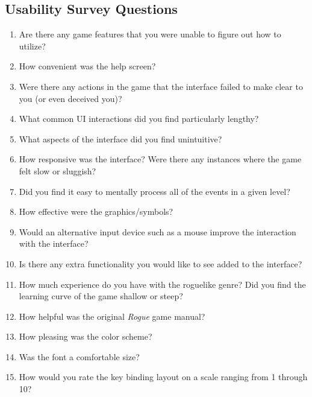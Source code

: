 \documentclass[12pt, titlepage]{article}
\begin{document}
\newpage
\subsection{Usability Survey Questions}
	\begin{enumerate}
		\item Are there any game features that you were unable to figure out how to utilize?
		\item How convenient was the help screen?
		\item Were there any actions in the game that the interface failed to make clear to you (or even deceived you)?
		\item What common UI interactions did you find particularly lengthy?
		\item What aspects of the interface did you find unintuitive?
		\item How responsive was the interface?  Were there any instances where the game felt slow or sluggish?
		\item Did you find it easy to mentally process all of the events in a given level?
		\item How effective were the graphics/symbols?
		\item Would an alternative input device such as a mouse improve the interaction with the interface?
		\item Is there any extra functionality you would like to see added to the interface?
		\item How much experience do you have with the roguelike genre?  Did you find the learning curve of the game shallow or steep? 
		\item How helpful was the original \textit{Rogue} game manual?
		\item How pleasing was the color scheme?
		\item Was the font a comfortable size?
		\item How would you rate the key binding layout on a scale ranging from 1 through 10?
	\end{enumerate}
\end{document}
